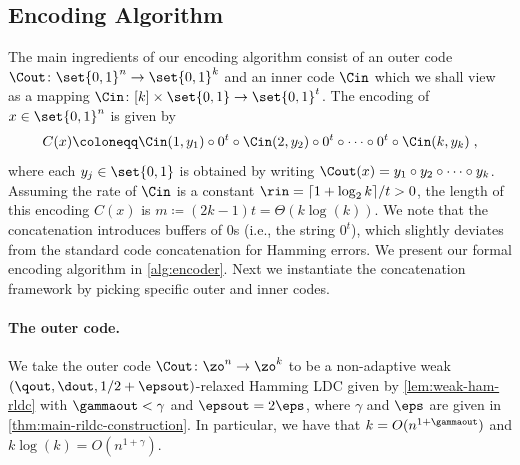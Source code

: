 
\subsection{Encoding Algorithm}\label{sec:wlrdc-enc}
The main ingredients of our encoding algorithm consist of an outer code $\Cout \colon \set{0,1}^n \rightarrow \set{0,1}^{k}$ and an inner code $\Cin$ which we shall view as a mapping $\Cin \colon [k] \times \set{0,1} \rightarrow \set{0,1}^{t}$. 
The encoding of $x \in \set{0,1}^n$ is given by %
\begin{align*}
	C(x) \coloneqq \Cin(1, y_1) \circ 0^t \circ \Cin(2, y_2) \circ 0^t \circ \dots \circ 0^t \circ \Cin(k, y_k)\; ,
\end{align*}
where each $y_j \in \set{0,1}$ is obtained by writing $\Cout(x)=y_1 \circ y_2 \circ \cdots \circ y_{k}$. %
Assuming the rate of $\Cin$ is a constant $\rin=\lceil 1+\log_2{k} \rceil /t > 0$, the length of this encoding $C(x)$ is $m\coloneqq (2k-1) t = \Theta(k\log(k))$. 
We note that the concatenation introduces buffers of 0s (i.e., the string $0^t$), which slightly deviates from the standard code concatenation for Hamming errors. 
We present our formal encoding algorithm in \cref{alg:encoder}.
Next we instantiate the concatenation framework by picking specific outer and inner codes.

\paragraph{The outer code.} We take the outer code $\Cout \colon \zo^n \rightarrow \zo^{k}$ to be a non-adaptive weak $(\qout,\dout,1/2 + \epsout)$-relaxed Hamming LDC given by \cref{lem:weak-ham-rldc} with $\gammaout < \gamma$ and $\epsout = 2\eps$, where $\gamma$ and $\eps$ are given in \cref{thm:main-rildc-construction}.
In particular, we have that $k = O(n^{1+\gammaout})$ and $k \log(k) = O(n^{1+\gamma})$.




